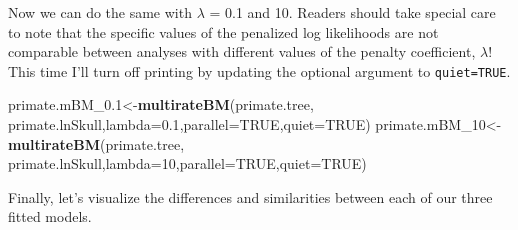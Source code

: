 \documentclass[fleqn,10pt,lineno]{wlpeerj} %
\newenvironment{Shaded}{\begin{snugshade}}{\end{snugshade}}
\newcommand{\AttributeTok}[1]{\textcolor[rgb]{0.13,0.29,0.53}{#1}}
\newcommand{\ConstantTok}[1]{\textcolor[rgb]{0.56,0.35,0.01}{#1}}
\newcommand{\DecValTok}[1]{\textcolor[rgb]{0.00,0.00,0.81}{#1}}
\newcommand{\FloatTok}[1]{\textcolor[rgb]{0.00,0.00,0.81}{#1}}
\newcommand{\FunctionTok}[1]{\textcolor[rgb]{0.13,0.29,0.53}{\textbf{#1}}}
\newcommand{\NormalTok}[1]{#1}
\newcommand{\OtherTok}[1]{\textcolor[rgb]{0.56,0.35,0.01}{#1}}
\begin{document}
Now we can do the same with \(\lambda\) = 0.1 and 10. Readers should take special care to note that the specific values of the penalized log likelihoods are not comparable between analyses with different values of the penalty coefficient, \(\lambda\)! This time I'll turn off printing by updating the optional argument to \texttt{quiet=TRUE}.

\begin{Shaded}
\begin{Highlighting}[]
\NormalTok{primate.mBM\_0}\FloatTok{.1}\OtherTok{\textless{}{-}}\FunctionTok{multirateBM}\NormalTok{(primate.tree,}
\NormalTok{  primate.lnSkull,}\AttributeTok{lambda=}\FloatTok{0.1}\NormalTok{,}\AttributeTok{parallel=}\ConstantTok{TRUE}\NormalTok{,}\AttributeTok{quiet=}\ConstantTok{TRUE}\NormalTok{)}
\NormalTok{primate.mBM\_10}\OtherTok{\textless{}{-}}\FunctionTok{multirateBM}\NormalTok{(primate.tree,}
\NormalTok{  primate.lnSkull,}\AttributeTok{lambda=}\DecValTok{10}\NormalTok{,}\AttributeTok{parallel=}\ConstantTok{TRUE}\NormalTok{,}\AttributeTok{quiet=}\ConstantTok{TRUE}\NormalTok{)}
\end{Highlighting}
\end{Shaded}

Finally, let's visualize the differences and similarities between each of our three fitted models.
\end{document}
